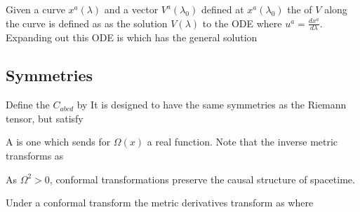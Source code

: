 \documentclass{article}
\begin{document}

\begin{definition}
Given a curve $x^a(\lambda)$ and a vector $V^a(\lambda_0)$ defined at $x^a(\lambda_0)$ the  of $V$ along the curve is defined as as the solution $V(\lambda)$ to the ODE
where $u^a = \frac{dx^a}{d\lambda}$. Expanding out this ODE is 
which has the general solution 
\end{definition}

\subsection{Symmetries}

\begin{definition}
Define the  $C_{abcd}$ by 
It is designed to have the same symmetries as the Riemann tensor, but satisfy 
\end{definition}

\begin{definition}
A  is one which sends 
for $\Omega(x)$ a real function. Note that the inverse metric transforms as 
\end{definition}

\begin{fact}
As $\Omega^2 > 0$, conformal transformations preserve the causal structure of spacetime. 
\end{fact}

\begin{lemma}
Under a conformal transform the metric derivatives transform as 
where 
\end{lemma}
\end{document}

